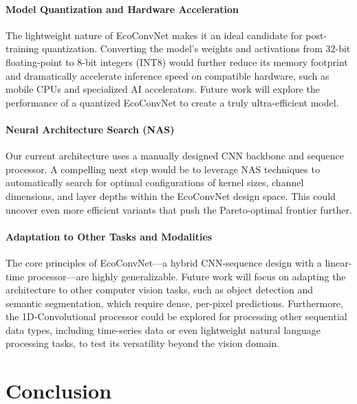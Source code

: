 \documentclass[12pt, a4paper]{article}
\begin{document}
\paragraph{Model Quantization and Hardware Acceleration} The lightweight nature of EcoConvNet makes it an ideal candidate for post-training quantization. Converting the model's weights and activations from 32-bit floating-point to 8-bit integers (INT8) would further reduce its memory footprint and dramatically accelerate inference speed on compatible hardware, such as mobile CPUs and specialized AI accelerators. Future work will explore the performance of a quantized EcoConvNet to create a truly ultra-efficient model.

\paragraph{Neural Architecture Search (NAS)} Our current architecture uses a manually designed CNN backbone and sequence processor. A compelling next step would be to leverage NAS techniques to automatically search for optimal configurations of kernel sizes, channel dimensions, and layer depths within the EcoConvNet design space. This could uncover even more efficient variants that push the Pareto-optimal frontier further.

\paragraph{Adaptation to Other Tasks and Modalities} The core principles of EcoConvNet—a hybrid CNN-sequence design with a linear-time processor—are highly generalizable. Future work will focus on adapting the architecture to other computer vision tasks, such as object detection and semantic segmentation, which require dense, per-pixel predictions. Furthermore, the 1D-Convolutional processor could be explored for processing other sequential data types, including time-series data or even lightweight natural language processing tasks, to test its versatility beyond the vision domain.





\section{Conclusion}
\label{sec:conclusion}
\end{document}
